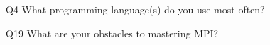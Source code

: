 \begin{description}%
\item{Q4} What programming language(s) do you use most often?%
\item{Q19} What are your obstacles to mastering MPI?%
\end{description}%
